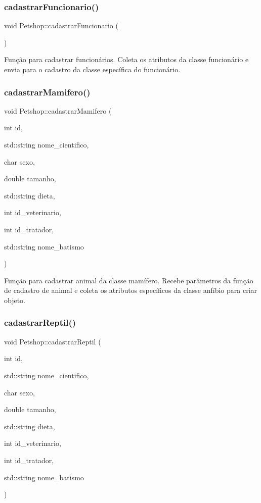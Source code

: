 \subsubsection{\texorpdfstring{cadastrar\+Funcionario()}{cadastrarFuncionario()}}
{\footnotesize\ttfamily void Petshop\+::cadastrar\+Funcionario (\begin{DoxyParamCaption}{ }\end{DoxyParamCaption})}

Função para cadastrar funcionários. Coleta os atributos da classe funcionário e envia para o cadastro da classe específica do funcionário. \mbox{\label{classPetshop_a28183f85c0d6a0073da2fbb7082a6abe}} 
\subsubsection{\texorpdfstring{cadastrar\+Mamifero()}{cadastrarMamifero()}}
{\footnotesize\ttfamily void Petshop\+::cadastrar\+Mamifero (\begin{DoxyParamCaption}\item[{int}]{id,  }\item[{std\+::string}]{nome\+\_\+cientifico,  }\item[{char}]{sexo,  }\item[{double}]{tamanho,  }\item[{std\+::string}]{dieta,  }\item[{int}]{id\+\_\+veterinario,  }\item[{int}]{id\+\_\+tratador,  }\item[{std\+::string}]{nome\+\_\+batismo }\end{DoxyParamCaption})}

Função para cadastrar animal da classe mamífero. Recebe parâmetros da função de cadastro de animal e coleta os atributos específicos da classe anfíbio para criar objeto. \mbox{\label{classPetshop_a7758d5a4e1893c72afd5ff7b3793d726}} 
\subsubsection{\texorpdfstring{cadastrar\+Reptil()}{cadastrarReptil()}}
{\footnotesize\ttfamily void Petshop\+::cadastrar\+Reptil (\begin{DoxyParamCaption}\item[{int}]{id,  }\item[{std\+::string}]{nome\+\_\+cientifico,  }\item[{char}]{sexo,  }\item[{double}]{tamanho,  }\item[{std\+::string}]{dieta,  }\item[{int}]{id\+\_\+veterinario,  }\item[{int}]{id\+\_\+tratador,  }\item[{std\+::string}]{nome\+\_\+batismo }\end{DoxyParamCaption})}

